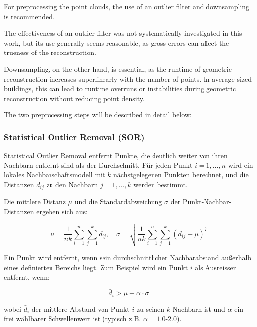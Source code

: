 \begin{English}
For preprocessing the point clouds, the use of an outlier filter and downsampling is recommended.

The effectiveness of an outlier filter was not systematically investigated in this work, but its use generally seems reasonable, as gross errors can affect the trueness of the reconstruction.

Downsampling, on the other hand, is essential, as the runtime of geometric reconstruction increases superlinearly with the number of points. In average-sized buildings, this can lead to runtime overruns or instabilities during geometric reconstruction without reducing point density.

The two preprocessing steps will be described in detail below:\\
\end{English}

\subsubsection{Statistical Outlier Removal (SOR)}
\begin{German}
    Statistical Outlier Removal entfernt Punkte, die deutlich weiter von ihren Nachbarn entfernt sind als der Durchschnitt.  
    Für jeden Punkt $i = 1, \dots, n$ wird ein lokales Nachbarschaftsmodell mit $k$ nächstgelegenen Punkten berechnet, und die Distanzen $d_{ij}$ zu den Nachbarn $j = 1, \dots, k$ werden bestimmt.

    Die mittlere Distanz $\mu$ und die Standardabweichung $\sigma$ der Punkt-Nachbar-Distanzen ergeben sich aus:

    \[
    \mu = \frac{1}{nk} \sum_{i=1}^{n} \sum_{j=1}^{k} d_{ij}, \quad
    \sigma = \sqrt{ \frac{1}{nk} \sum_{i=1}^{n} \sum_{j=1}^{k} (d_{ij} - \mu)^2 }
    \]

    Ein Punkt wird entfernt, wenn sein durchschnittlicher Nachbarabstand außerhalb eines definierten Bereichs liegt.  
    Zum Beispiel wird ein Punkt $i$ als Ausreisser entfernt, wenn:

    \[
    \bar{d}_i > \mu + \alpha \cdot \sigma
    \]

    wobei $\bar{d}_i$ der mittlere Abstand von Punkt $i$ zu seinen $k$ Nachbarn ist und $\alpha$ ein frei wählbarer Schwellenwert ist (typisch z.B. $\alpha = 1.0\text{-}2.0$). \cite{liu3DPointCloud2021}
\end{German}

